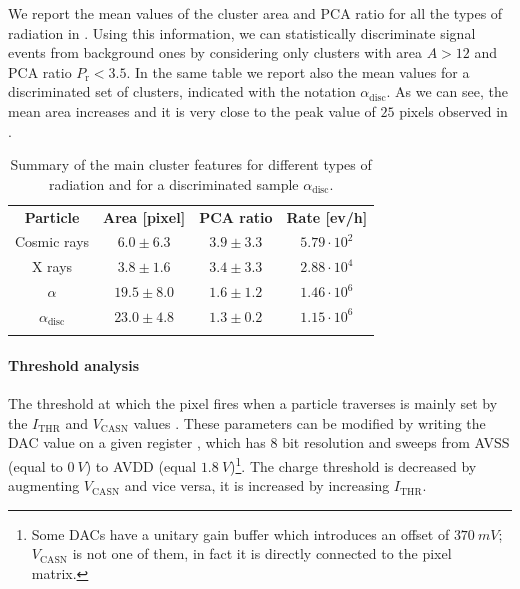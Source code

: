 \documentclass[../../main/main.tex]{subfiles}
\begin{document}
We report the mean values of the cluster area and PCA ratio for all the types of radiation in .
Using this information, we can statistically discriminate signal events from background ones by considering only clusters with area \( A > 12 \) and PCA ratio \( P_{\mathrm{r}} < 3.5 \). In the same table we report also the mean values for a discriminated set of clusters, indicated with the notation \( \alpha_{\mathrm{disc}} \). As we can see, the mean area increases and it is very close to the peak value of \( 25 \) pixels observed in .

\begin{table}[!h]
    \centering
    \begin{tabular}{c|ccc}
        \toprule
        \textbf{Particle} & \textbf{Area [pixel]}    & \textbf{PCA ratio} & \textbf{Rate [ev/h]}    \\
        \colrule
        Cosmic rays         & $6.0\pm6.3$   & $3.9\pm3.3$ & $5.79 \cdot 10^{2}$  \\
        X rays              & $3.8\pm1.6$   & $3.4\pm3.3$ & $2.88 \cdot 10^{4}$ \\
        $\alpha$            & $19.5\pm8.0$  & $1.6\pm1.2$ & $1.46 \cdot 10^{6}$ \\
        $\alpha_{\mathrm{disc}}$     & $23.0\pm4.8$  & $1.3\pm0.2$ & $1.15 \cdot 10^{6}$ \\
        \botrule
    \end{tabular}
    \caption{Summary of the main cluster features for different types of radiation and for a discriminated sample \( \alpha_{\mathrm{disc}} \).}
    \label{tab:clust_features}
\end{table}


\paragraph{Threshold analysis}
The threshold at which the pixel fires when a particle traverses is mainly set by the $I_{\mathrm{THR}}$ and $V_{\mathrm{CASN}}$ values \cite{Manual_ALP}.
These parameters can be modified by writing the DAC value on a given register \cite{Manual_ALP}, which has 8 bit resolution and sweeps from AVSS (equal to \( 0 \ \si{V} \)) to AVDD (equal \( 1.8 \ \si{V} \))\footnote{Some DACs have a unitary gain buffer which introduces an offset of \( 370 \ \si{mV} \); $V_{\mathrm{CASN}}$ is not one of them, in fact it is directly connected to the pixel matrix.}.
The charge threshold is decreased by augmenting $V_{\mathrm{CASN}}$ and vice versa, it is increased by increasing $I_{\mathrm{THR}}$.
\end{document}
